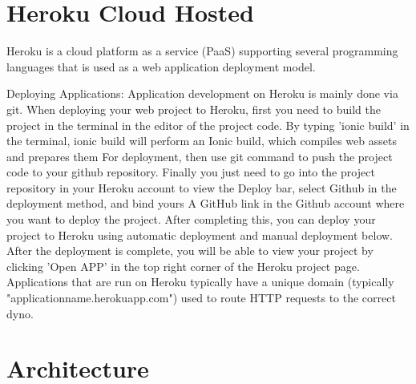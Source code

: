 \section{Heroku Cloud Hosted}
Heroku is a cloud platform as a service (PaaS) supporting several programming languages that is used as a web application deployment model.
\item Deploying Applications: Application development on Heroku is mainly done via git. When deploying your web project to Heroku, first you need to build the project in the terminal in the editor of the project code. By typing 'ionic build' in the terminal, ionic build will perform an Ionic build, which compiles web assets and prepares them For deployment, then use git command to push the project code to your github repository. Finally you just need to go into the project repository in your Heroku account to view the Deploy bar, select Github in the deployment method, and bind yours A GitHub link in the Github account where you want to deploy the project. After completing this, you can deploy your project to Heroku using automatic deployment and manual deployment below. After the deployment is complete, you will be able to view your project by clicking 'Open APP' in the top right corner of the Heroku project page. \\ 
Applications that are run on Heroku typically have a unique domain (typically "applicationname.herokuapp.com") used to route HTTP requests to the correct dyno.
\section{Architecture}
